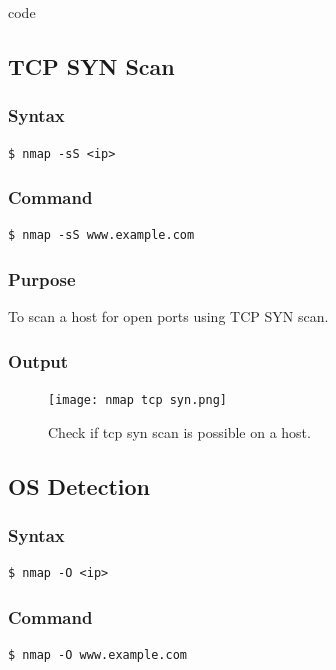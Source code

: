 code \documentclass[11pt]{article}
\begin{document}
\subsection{TCP SYN Scan}

\subsubsection{Syntax}
\begin{verbatim}
$ nmap -sS <ip>
\end{verbatim}

\subsubsection*{Command}
\begin{verbatim}
$ nmap -sS www.example.com
\end{verbatim}

\subsubsection*{Purpose}
To scan a host for open ports using TCP SYN scan.

\subsubsection*{Output}
\begin{figure}[H]
    \centering
    \texttt{[image: nmap tcp syn.png]}
    \caption{Check if tcp syn scan is possible on a host. }
    \label{fig:1}
\end{figure}

\subsection{OS Detection}

\subsubsection{Syntax}
\begin{verbatim}
$ nmap -O <ip>
\end{verbatim}

\subsubsection*{Command}
\begin{verbatim}
$ nmap -O www.example.com
\end{verbatim}
\end{document}
